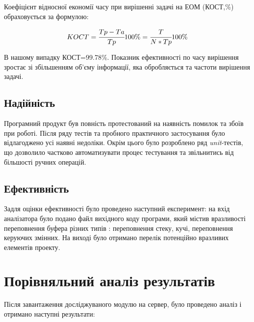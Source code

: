 Коефіцієнт відносної економії часу при вирішенні задачі на ЕОМ (КОСТ,\%) обраховується за формулою:

\begin{equation}
  KOCT = \cfrac{Tp-Ta}{Tp}100\% = \cfrac{T}{N*Tp}100\%
\end{equation}

В нашому випадку КОСТ=99.78\%.
Показник ефективності по часу вирішення зростає зі збільшенням об’єму інформації, яка обробляється та частоти вирішення задачі.

\subsection{Надійність}\label{mark_relayeble}
Програмний продукт був повність протестований на наявність помилок та збоїв при роботі. Після ряду тестів та пробного практичного застосування було відлагоджено усі наявні недоліки. Окрім цього було розроблено ряд {\it unit}-тестів, що дозволило частково автоматизувати процес тестування та звільнитись від більшості ручних операцій.

\subsection{Ефективність}\label{mark_afford}
Задля оцінки ефективності було проведено наступний експеримент: на вхід аналізатора було подано файл вихідного коду програми, який містив вразливості переповнення буфера різних типів : переповнення стеку, кучі, переповнення керуючих змінних. На виході було отримано перелік потенційно вразливих елементів проекту.

\pagebreak

\section{Порівняльний аналіз результатів}
\label{4section:id3}
Після завантаження досліджуваного модулю на сервер, було проведено аналіз і отримано наступні результати:

